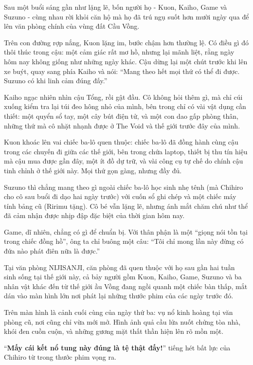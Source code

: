 \documentclass[../main.tex]{subfiles}
\begin{document}
\il

Sau một buổi sáng gần như lặng lẽ, bốn người họ - Kuon, Kaiho, Game và Suzuno - cùng nhau rời khỏi căn hộ mà họ đã trú ngụ suốt hơn mười ngày qua để lên văn phòng chính của vùng đất Cầu Vồng.

Trên con đường rợp nắng, Kuon lặng im, bước chậm hơn thường lệ. Có điều gì đó thôi thúc trong cậu: một cảm giác rất mơ hồ, nhưng lại mãnh liệt, rằng ngày hôm nay không giống như những ngày khác. Cậu dừng lại một chút trước khi lên xe buýt, quay sang phía Kaiho và nói: ``Mang theo hết mọi thứ có thể đi được. Suzuno có khi linh cảm đúng đấy.''

Kaiho ngạc nhiên nhìn cậu Tổng, rồi gật đầu. Cô không hỏi thêm gì, mà chỉ cúi xuống kiểm tra lại túi đeo hông nhỏ của mình, bên trong chỉ có vài vật dụng cần thiết: một quyển sổ tay, một cây bút điện tử, và một con dao gấp phòng thân, những thứ mà cô nhặt nhạnh được ở The Void và thế giới trước đây của mình.

Kuon khoác lên vai chiếc ba-lô quen thuộc: chiếc ba-lô đã đồng hành cùng cậu trong các chuyến đi giữa các thế giới, bên trong chứa laptop, thiết bị thu tín hiệu mà cậu mua được gần đây, một ít đồ dự trữ, và vài công cụ tự chế do chính cậu tinh chỉnh ở thế giới này. Mọi thứ gọn gàng, nhưng đầy đủ.

Suzuno thì chẳng mang theo gì ngoài chiếc ba-lô học sinh nhẹ tênh (mà Chihiro cho cô sau buổi đi dạo hai ngày trước) với cuốn sổ ghi chép và một chiếc máy tính bảng cũ (Ririmu tặng). Cô bé vẫn lặng lẽ, nhưng ánh mắt chăm chú như thể đã cảm nhận được nhịp đập đặc biệt của thời gian hôm nay.

Game, dĩ nhiên, chẳng có gì để chuẩn bị. Với thân phận là một ``giọng nói tồn tại trong chiếc đồng hồ'', ông ta chỉ buông một câu: ``Tôi chỉ mong lần này đừng có đứa nào phát điên nữa là được.''

\ct

Tại văn phòng NIJISANJI, căn phòng đã quen thuộc với họ sau gần hai tuần sinh sống tại thế giới này, cả bảy người gồm Kuon, Kaiho, Game, Suzuno và ba nhân vật khác đến từ thế giới ầu Vồng đang ngồi quanh một chiếc bàn thấp, mắt dán vào màn hình lớn nơi phát lại những thước phim của các ngày trước đó.

Trên màn hình là cảnh cuối cùng của ngày thứ ba: vụ nổ kinh hoàng tại văn phòng cũ, nơi cũng chỉ vừa mới mở. Hình ảnh quả cầu lửa nuốt chửng tòa nhà, khói đen cuồn cuộn, và những gương mặt thất thần hiện lên rõ mồn một.

``\textbf{Mấy cái kết nổ tung này đúng là tệ thật đấy!}'' tiếng hét bất lực của Chihiro từ trong thước phim vọng ra.
\end{document}
